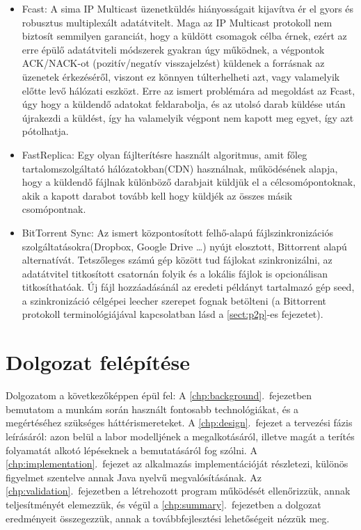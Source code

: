 \begin{itemize}
  \item Fcast\cite{gemmell2000fcast}: A sima IP Multicast üzenetküldés hiányosságait kijavítva ér el gyors és robusztus multiplexált adatátvitelt. Maga az IP Multicast protokoll nem biztosít semmilyen garanciát, hogy a küldött csomagok célba érnek, ezért az erre épülő adatátviteli módszerek gyakran úgy működnek, a végpontok ACK/NACK-ot (pozitív/negatív visszajelzést) küldenek a forrásnak az üzenetek érkezéséről, viszont ez könnyen túlterhelheti azt, vagy valamelyik előtte levő hálózati eszközt. Erre az ismert problémára ad megoldást az Fcast, úgy hogy a küldendő adatokat feldarabolja, és az utolsó darab küldése után újrakezdi a küldést, így ha valamelyik végpont nem kapott meg egyet, így azt pótolhatja.
  \item FastReplica\cite{cherkasova2003fastreplica}:  Egy olyan fájlterítésre használt algoritmus, amit főleg tartalomszolgáltató hálózatokban(CDN) használnak, működésének alapja, hogy a küldendő fájlnak különböző darabjait küldjük el a célcsomópontoknak, akik a kapott darabot tovább kell hogy küldjék az összes másik csomópontnak.
  \item BitTorrent Sync\cite{farina2014bittorrent}: Az ismert központosított felhő-alapú fájlszinkronizációs szolgáltatásokra(Dropbox, Google Drive \ldots) nyújt elosztott, Bittorrent alapú alternatívát. Tetszőleges számú gép között tud fájlokat szinkronizálni, az adatátvitel titkosított csatornán folyik és a lokális fájlok is opcionálisan titkosíthatóak. Új fájl hozzáadásánál az eredeti példányt tartalmazó gép seed, a szinkronizáció célgépei leecher szerepet fognak betölteni (a Bittorrent protokoll terminológiájával kapcsolatban lásd a \ref{sect:p2p}-es fejezetet).
\end{itemize}

\section{Dolgozat felépítése}

Dolgozatom a következőképpen épül fel:
A \ref{chp:background}.~fejezetben bemutatom a munkám során használt fontosabb technológiákat, és a megértéséhez szükséges háttérismereteket. A \ref{chp:design}.~fejezet a tervezési fázis leírásáról: azon belül a labor modelljének a megalkotásáról, illetve magát a terítés folyamatát alkotó lépéseknek a bemutatásáról fog szólni. A \ref{chp:implementation}.~fejezet az alkalmazás implementációját részletezi, különös figyelmet szentelve annak Java nyelvű megvalósításának. Az \ref{chp:validation}.~fejezetben a létrehozott program működését ellenőrizzük, annak teljesítményét elemezzük, és végül a \ref{chp:summary}.~fejezetben a dolgozat eredményeit összegezzük, annak a továbbfejlesztési lehetőségeit nézzük meg.
